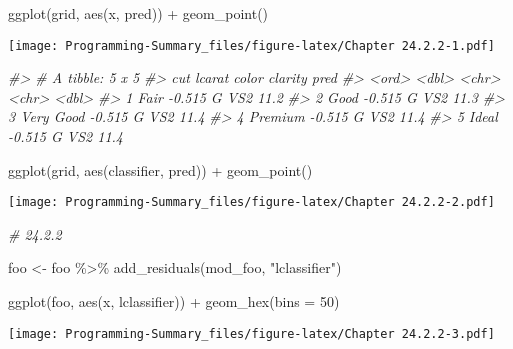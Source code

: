 \documentclass[
]{article}
\newenvironment{Shaded}{\begin{snugshade}}{\end{snugshade}}
\newcommand{\AttributeTok}[1]{\textcolor[rgb]{0.77,0.63,0.00}{#1}}
\newcommand{\CommentTok}[1]{\textcolor[rgb]{0.56,0.35,0.01}{\textit{#1}}}
\newcommand{\DecValTok}[1]{\textcolor[rgb]{0.00,0.00,0.81}{#1}}
\newcommand{\FunctionTok}[1]{\textcolor[rgb]{0.00,0.00,0.00}{#1}}
\newcommand{\NormalTok}[1]{#1}
\newcommand{\OtherTok}[1]{\textcolor[rgb]{0.56,0.35,0.01}{#1}}
\newcommand{\SpecialCharTok}[1]{\textcolor[rgb]{0.00,0.00,0.00}{#1}}
\newcommand{\StringTok}[1]{\textcolor[rgb]{0.31,0.60,0.02}{#1}}
\begin{document}
\begin{Shaded}
\begin{Highlighting}[]
\FunctionTok{ggplot}\NormalTok{(grid, }\FunctionTok{aes}\NormalTok{(x, pred)) }\SpecialCharTok{+} 
  \FunctionTok{geom\_point}\NormalTok{()}
\end{Highlighting}
\end{Shaded}

\texttt{[image: Programming-Summary\_files/figure-latex/Chapter 24.2.2-1.pdf]}

\begin{Shaded}
\begin{Highlighting}[]
\CommentTok{\#\textgreater{} \# A tibble: 5 x 5}
\CommentTok{\#\textgreater{}   cut       lcarat color clarity  pred}
\CommentTok{\#\textgreater{}   \textless{}ord\textgreater{}      \textless{}dbl\textgreater{} \textless{}chr\textgreater{} \textless{}chr\textgreater{}   \textless{}dbl\textgreater{}}
\CommentTok{\#\textgreater{} 1 Fair      {-}0.515 G     VS2      11.2}
\CommentTok{\#\textgreater{} 2 Good      {-}0.515 G     VS2      11.3}
\CommentTok{\#\textgreater{} 3 Very Good {-}0.515 G     VS2      11.4}
\CommentTok{\#\textgreater{} 4 Premium   {-}0.515 G     VS2      11.4}
\CommentTok{\#\textgreater{} 5 Ideal     {-}0.515 G     VS2      11.4}

\FunctionTok{ggplot}\NormalTok{(grid, }\FunctionTok{aes}\NormalTok{(classifier, pred)) }\SpecialCharTok{+} 
  \FunctionTok{geom\_point}\NormalTok{()}
\end{Highlighting}
\end{Shaded}

\texttt{[image: Programming-Summary\_files/figure-latex/Chapter 24.2.2-2.pdf]}

\begin{Shaded}
\begin{Highlighting}[]
\CommentTok{\# 24.2.2}

\NormalTok{ foo }\OtherTok{\textless{}{-}}\NormalTok{ foo }\SpecialCharTok{\%\textgreater{}\%} 
 \FunctionTok{add\_residuals}\NormalTok{(mod\_foo, }\StringTok{"lclassifier"}\NormalTok{)}

 \FunctionTok{ggplot}\NormalTok{(foo, }\FunctionTok{aes}\NormalTok{(x, lclassifier)) }\SpecialCharTok{+} 
    \FunctionTok{geom\_hex}\NormalTok{(}\AttributeTok{bins =} \DecValTok{50}\NormalTok{)}
\end{Highlighting}
\end{Shaded}

\texttt{[image: Programming-Summary\_files/figure-latex/Chapter 24.2.2-3.pdf]}
\end{document}
